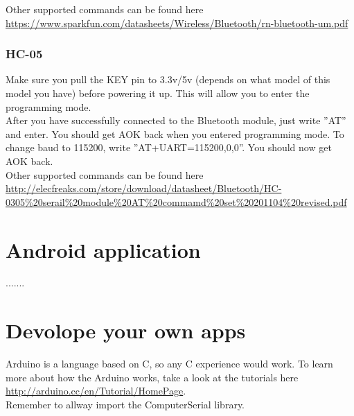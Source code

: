				Other supported commands can be found here \url{https://www.sparkfun.com/datasheets/Wireless/Bluetooth/rn-bluetooth-um.pdf}

				\subsubsection{HC-05}
				Make sure you pull the KEY pin to 3.3v/5v (depends on what model of this model you have) before powering it up. This will allow you to enter the programming mode.\\
				
				After you have successfully connected to the Bluetooth module, just write ''AT'' and enter. You should get AOK back when you entered programming mode. To change baud to 115200, write ''AT+UART=115200,0,0''. You should now get AOK back.\\
				
				Other supported commands can be found here \url{http://elecfreaks.com/store/download/datasheet/Bluetooth/HC-0305%20serail%20module%20AT%20commamd%20set%20201104%20revised.pdf}
				
	\section{Android application}\label{sec:install-android-application}
	.......
	
	\section{Devolope your own apps}
	Arduino is a language based on C, so any C experience would work. To learn more about how the Arduino works, take a look at the tutorials here \url{http://arduino.cc/en/Tutorial/HomePage}.\\
	
	Remember to allway import the ComputerSerial library.